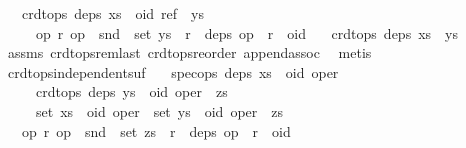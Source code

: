\begin{isabellebody}
\ \ \ {\isachardoublequoteopen}crdt{\isacharunderscore}ops\ deps\ {\isacharparenleft}xs\ {\isacharat}\ {\isacharbrackleft}{\isacharparenleft}oid{\isacharcomma}\ ref{\isacharparenright}{\isacharbrackright}\ {\isacharat}\ ys{\isacharparenright}{\isachardoublequoteclose}\isanewline
\ \ \ \ \ {\isachardoublequoteopen}{\isasymAnd}op{}\ r{\isachardot}\ op{}\ {\isasymin}\ snd\ {\isacharbackquote}\ set\ ys\ {\isasymLongrightarrow}\ r\ {\isasymin}\ deps\ op{}\ {\isasymLongrightarrow}\ r\ {\isasymnoteq}\ oid{\isachardoublequoteclose}\isanewline
\ \ \ {\isachardoublequoteopen}crdt{\isacharunderscore}ops\ deps\ {\isacharparenleft}xs\ {\isacharat}\ ys{\isacharparenright}{\isachardoublequoteclose}\isanewline
%
\isadelimproof
%
\endisadelimproof
%
\isatagproof
{}\isamarkupfalse%
\ assms\ crdt{\isacharunderscore}ops{\isacharunderscore}rem{\isacharunderscore}last\ crdt{\isacharunderscore}ops{\isacharunderscore}reorder\ append{\isacharunderscore}assoc\ \isamarkupfalse%
\ metis%
\endisatagproof
{\isafoldproof}%
%
\isadelimproof
\isanewline
%
\endisadelimproof
\isanewline
{}\isamarkupfalse%
\ crdt{\isacharunderscore}ops{\isacharunderscore}independent{\isacharunderscore}suf{\isacharcolon}\isanewline
\ \ \ {\isachardoublequoteopen}spec{\isacharunderscore}ops\ deps\ {\isacharparenleft}xs\ {\isacharat}\ {\isacharbrackleft}{\isacharparenleft}oid{\isacharcomma}\ oper{\isacharparenright}{\isacharbrackright}{\isacharparenright}{\isachardoublequoteclose}\isanewline
\ \ \ \ \ {\isachardoublequoteopen}crdt{\isacharunderscore}ops\ deps\ {\isacharparenleft}ys\ {\isacharat}\ {\isacharbrackleft}{\isacharparenleft}oid{\isacharcomma}\ oper{\isacharparenright}{\isacharbrackright}\ {\isacharat}\ zs{\isacharparenright}{\isachardoublequoteclose}\isanewline
\ \ \ \ \ {\isachardoublequoteopen}set\ {\isacharparenleft}xs\ {\isacharat}\ {\isacharbrackleft}{\isacharparenleft}oid{\isacharcomma}\ oper{\isacharparenright}{\isacharbrackright}{\isacharparenright}\ {\isacharequal}\ set\ {\isacharparenleft}ys\ {\isacharat}\ {\isacharbrackleft}{\isacharparenleft}oid{\isacharcomma}\ oper{\isacharparenright}{\isacharbrackright}\ {\isacharat}\ zs{\isacharparenright}{\isachardoublequoteclose}\isanewline
\ \ \ {\isachardoublequoteopen}{\isasymAnd}op{}\ r{\isachardot}\ op{}\ {\isasymin}\ snd\ {\isacharbackquote}\ set\ zs\ {\isasymLongrightarrow}\ r\ {\isasymin}\ deps\ op{}\ {\isasymLongrightarrow}\ r\ {\isasymnoteq}\ oid{\isachardoublequoteclose}\isanewline

\end{isabellebody}
